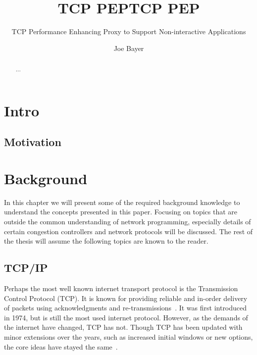 \documentclass[a4paper,english, 11pt]{report}
\author{Joe Bayer}
\title{TCP PEP}
\subtitle{TCP Performance Enhancing Proxy to Support Non-interactive Applications}
\title{TCP PEP}
\begin{document}
 \uiomasterfp[program={Informatics: Programming and System Architecture}, supervisors={Michael Welzl\and Kristjon Ciko}]
\tableofcontents


\listoffigures
{}

\begin{abstract}
   ...
\end{abstract}

\chapter{Intro}

\section{Motivation}

\chapter{Background}

In this chapter we will present some of the required background knowledge to understand the concepts presented in this paper. Focusing on topics that are outside the common understanding of network programming, especially details of certain congestion controllers and network protocols will be discussed. The rest of the thesis will assume the following topics are known to the reader. 

\section{TCP/IP}
Perhaps the most well known internet transport protocol is the Transmission Control Protocol (TCP). It is known for providing reliable and in-order delivery of packets using acknowledgments and re-transmissions~\cite{Eddy_2022}. It was first introduced in 1974, but is still the most used internet protocol. However, as the demands of the internet have changed, TCP has not. Though TCP has been updated with minor extensions over the years, such as increased initial windows or new options, the core ideas have stayed the same~\cite{rfc8803}.\\
\end{document}
